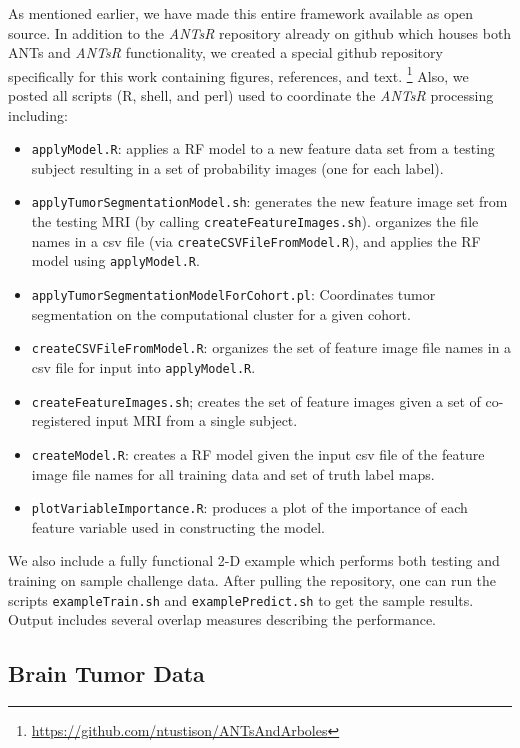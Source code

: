 \documentclass[preprint,authoryear,review,12pt]{elsarticle}
\begin{document}
As mentioned earlier, we have made this entire framework
available as open source.  In addition to the \textit{ANTsR} repository
already on github which houses both ANTs and \textit{ANTsR} functionality, 
we created a special github repository specifically for this work
containing figures, references, and text.%
\footnote{
\href{https://github.com/ntustison/ANTsAndArboles}{https://github.com/ntustison/ANTsAndArboles}
}
Also, we posted all
scripts (R, shell, and perl) used to coordinate the \textit{ANTsR} processing 
including:
\begin{itemize}
  \item {\tt applyModel.R}:  applies a RF model to a new 
  feature data set from a testing subject resulting in a set of probability
  images (one for each label).
  \item {\tt applyTumorSegmentationModel.sh}:  generates the new feature image set 
  from the testing MRI (by calling {\tt createFeatureImages.sh}).
  organizes the file names in a csv file (via {\tt createCSVFileFromModel.R}),
  and applies the RF model using {\tt applyModel.R}. 
  \item {\tt applyTumorSegmentationModelForCohort.pl}:  Coordinates tumor 
  segmentation on the computational cluster for a given cohort.
  \item {\tt createCSVFileFromModel.R}:  organizes the set of feature image
  file names in a csv file for input into {\tt applyModel.R}.
  \item {\tt createFeatureImages.sh};  creates the set of feature images given
  a set of co-registered input MRI from a single subject. 
  \item {\tt createModel.R}:  creates a RF model given the input csv 
  file of the feature image file names for all training data and set of truth
  label maps.
  \item {\tt plotVariableImportance.R}:  produces a plot of the importance 
   of each feature variable used 
  in constructing the model.
\end{itemize}
We also include a fully functional 2-D example which performs
both testing and training on sample challenge data.
After pulling the repository, one can run the scripts {\tt exampleTrain.sh}
and {\tt examplePredict.sh} to get the sample results.  Output includes
several overlap measures describing the performance.

\subsection{Brain Tumor Data}
\end{document}
